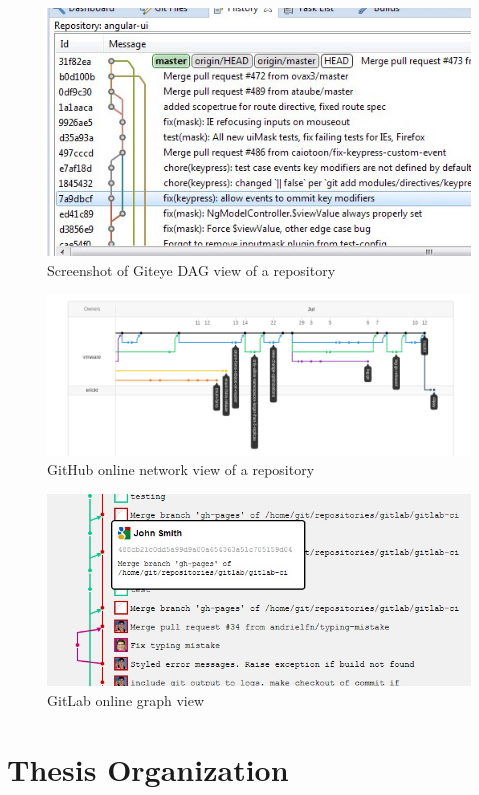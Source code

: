 \begin{figure}[htpb]
  \centering
  \includegraphics[width=0.8\linewidth]{Figures/introduction/giteye_graph.jpg}
  \caption{Screenshot of Giteye DAG view of a repository}
  \label{fig:giteye_screenshot}
\end{figure}

\begin{figure}[htpb]
  \centering
  \includegraphics[width=0.8\linewidth]{Figures/introduction/github_dag.png}
  \caption{GitHub online network view of a repository}
  \label{fig:github_dag_screenshot}
\end{figure}

\begin{figure}[htpb]
  \centering
  \includegraphics[width=0.8\linewidth]{Figures/introduction/gitlab_graph.jpg}
  \caption{GitLab online graph view}
  \label{fig:gitlab_dag_screenshot}
\end{figure}

\section{Thesis Organization}\label{sec:thesis_organization}

